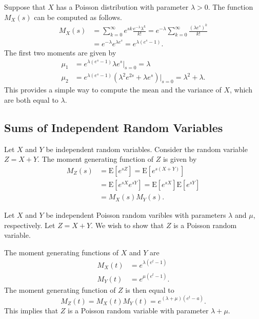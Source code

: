 \begin{example}
Suppose that $X$ has a Poisson distribution with parameter $\lambda > 0$.
The function $M_X(s)$ can be computed as follows.
\begin{equation*}
\begin{split}
M_X(s) &= \sum_{k = 0}^\infty e^{sk} \frac{e^{-\lambda}\lambda^k}{k!}
= e^{-\lambda} \sum_{k = 0}^\infty \frac{(\lambda e^s)^k}{k!} \\
&= e^{-\lambda} e^{\lambda e^s} = e^{\lambda(e^s - 1)} .
\end{split}
\end{equation*}
The first two moments are given by
\begin{align*}
\mu_1 &= e^{\lambda(e^s - 1)} \lambda e^s \Big|_{s = 0} = \lambda \\
\mu_2 &= e^{\lambda(e^s - 1)} \left( \lambda^2 e^{2s} + \lambda e^s \right)
\Big|_{s = 0} = \lambda^2 + \lambda .
\end{align*} 
This provides a simple way to compute the mean and the variance of $X$, which are both equal to $\lambda$.
\end{example}



\subsection{Sums of Independent Random Variables}

Let $X$ and $Y$ be independent random variables.
Consider the random variable $Z = X + Y$.
The moment generating function of $Z$ is given by
\begin{equation*}
\begin{split}
M_Z (s) &= \mathrm{E} \left[ e^{sZ} \right]
= \mathrm{E} \left[ e^{s(X + Y)} \right] \\
&= \mathrm{E} \left[ e^{sX} e^{sY} \right]
= \mathrm{E} \left[ e^{sX} \right] \mathrm{E} \left[ e^{sY} \right] \\
&= M_X(s) M_Y(s) .
\end{split}
\end{equation*}

\begin{example}
Let $X$ and $Y$ be independent Poisson random varibles with parameters $\lambda$ and $\mu$, respectively.
Let $Z = X + Y$.
We wish to show that $Z$ is a Poisson random variable.

The moment generating functions of $X$ and $Y$ are
\begin{align*}
M_X (t) &= e^{\lambda ( e^t -1)} \\
M_Y (t) &= e^{\mu ( e^t -1)} .
\end{align*}
The moment generating function of $Z$ is then equal to
\begin{equation*}
M_Z (t) = M_X (t) M_Y (t) = e^{(\lambda + \mu) (e^t - a)} .
\end{equation*}
This implies that $Z$ is a Poisson random variable with parameter $\lambda + \mu$.
\end{example}


